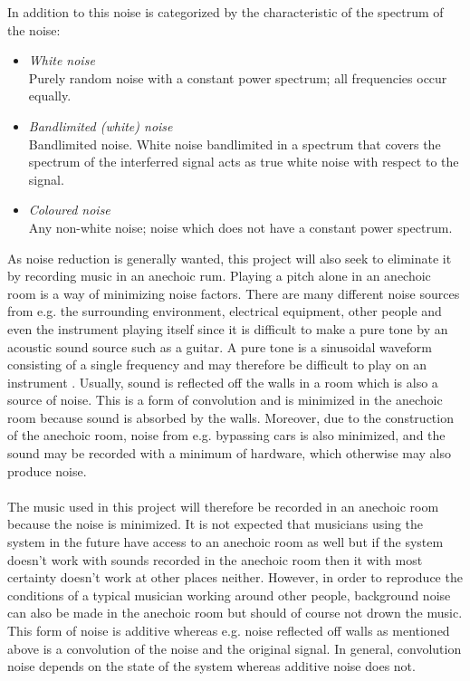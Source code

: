 In addition to this noise is categorized by the characteristic of the spectrum of the noise:
\begin{itemize}
\item \textit{White noise}\\
Purely random noise with a constant power spectrum; all frequencies occur equally.
\item \textit{Bandlimited (white) noise}\\
Bandlimited noise. White noise bandlimited in a spectrum that covers the spectrum of the interferred signal acts as true white noise with respect to the signal.
\item \textit{Coloured noise}\\
Any non-white noise; noise which does not have a constant power spectrum.
\end{itemize}

As noise reduction is generally wanted, this project will also seek to eliminate it by recording music in an anechoic rum. Playing a pitch alone in an anechoic room is a way of minimizing noise factors. There are many different noise sources from e.g. the surrounding environment, electrical equipment, other people and even the instrument playing itself since it is difficult to make a pure tone by an acoustic sound source such as a guitar. A pure tone is a sinusoidal waveform consisting of a single frequency and may therefore be difficult to play on an instrument \cite{AcousticNoise}. Usually, sound is reflected off the walls in a room which is also a source of noise. This is a form of convolution and is minimized in the anechoic room because sound is absorbed by the walls. Moreover, due to the construction of the anechoic room, noise from e.g. bypassing cars is also minimized, and the sound may be recorded with a minimum of hardware, which otherwise may also produce noise.
\\ \\
The music used in this project will therefore be recorded in an anechoic room because the noise is minimized. It is not expected that musicians using the system in the future have access to an anechoic room as well but if the system doesn't work with sounds recorded in the anechoic room then it with most certainty doesn't work at other places neither. However, in order to reproduce the conditions of a typical musician working around other people, background noise can also be made in the anechoic room but should of course not drown the music. This form of noise is additive whereas e.g. noise reflected off walls as mentioned above is a convolution of the noise and the original signal. In general, convolution noise depends on the state of the system whereas additive noise does not.
